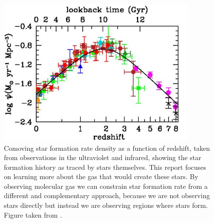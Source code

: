 \documentclass[twoside,single]{lion-msc}
\begin{document}
\begin{figure}[tbp]
\centering \includegraphics[width=100mm]{results_text/figure9a.jpg}
\caption{Comoving star formation rate density as a function of redshift, taken from observations in the ultraviolet and infrared, showing the  star formation history as traced by stars themselves. This report focuses on learning more about the gas that would create these stars. By observing molecular gas we can constrain star formation rate from a different and complementary approach, because we are not observing stars directly but instead we are observing regions where stars form. Figure taken from \cite{madau2014cosmic}.}
\label{fig:SFR_History}
\end{figure}



\end{document}
